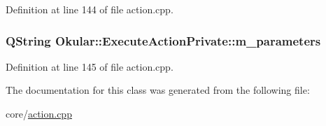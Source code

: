 Definition at line 144 of file action.\+cpp.

\hypertarget{classOkular_1_1ExecuteActionPrivate_a8916a57c92ce0ff318b2d8a5edcd96a4}{
\subsubsection[{m\+\_\+parameters}]{\setlength{\rightskip}{0pt plus 5cm}Q\+String Okular\+::\+Execute\+Action\+Private\+::m\+\_\+parameters}}\label{classOkular_1_1ExecuteActionPrivate_a8916a57c92ce0ff318b2d8a5edcd96a4}


Definition at line 145 of file action.\+cpp.



The documentation for this class was generated from the following file\+:\begin{DoxyCompactItemize}
\item 
core/\hyperlink{action_8cpp}{action.\+cpp}\end{DoxyCompactItemize}

